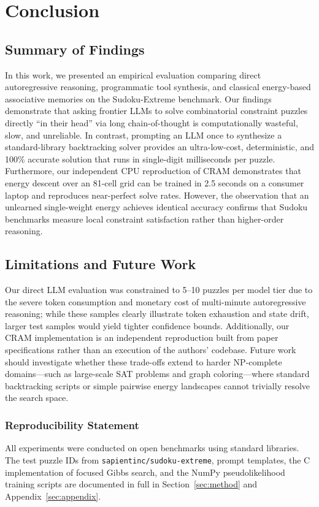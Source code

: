 \documentclass{article} %
\begin{document}
\section{Conclusion}
\label{sec:conclusion}
\subsection{Summary of Findings}
In this work, we presented an empirical evaluation comparing direct autoregressive reasoning, programmatic tool synthesis, and classical energy-based associative memories on the Sudoku-Extreme benchmark. Our findings demonstrate that asking frontier LLMs to solve combinatorial constraint puzzles directly ``in their head'' via long chain-of-thought is computationally wasteful, slow, and unreliable. In contrast, prompting an LLM once to synthesize a standard-library backtracking solver provides an ultra-low-cost, deterministic, and 100\% accurate solution that runs in single-digit milliseconds per puzzle. Furthermore, our independent CPU reproduction of CRAM demonstrates that energy descent over an 81-cell grid can be trained in 2.5 seconds on a consumer laptop and reproduces near-perfect solve rates. However, the observation that an unlearned single-weight energy achieves identical accuracy confirms that Sudoku benchmarks measure local constraint satisfaction rather than higher-order reasoning.

\subsection{Limitations and Future Work}
Our direct LLM evaluation was constrained to 5--10 puzzles per model tier due to the severe token consumption and monetary cost of multi-minute autoregressive reasoning; while these samples clearly illustrate token exhaustion and state drift, larger test samples would yield tighter confidence bounds. Additionally, our CRAM implementation is an independent reproduction built from paper specifications rather than an execution of the authors' codebase. Future work should investigate whether these trade-offs extend to harder NP-complete domains—such as large-scale SAT problems and graph coloring—where standard backtracking scripts or simple pairwise energy landscapes cannot trivially resolve the search space.

\subsubsection*{Reproducibility Statement}
All experiments were conducted on open benchmarks using standard libraries. The test puzzle IDs from \texttt{sapientinc/sudoku-extreme}, prompt templates, the C implementation of focused Gibbs search, and the NumPy pseudolikelihood training scripts are documented in full in Section~\ref{sec:method} and Appendix~\ref{sec:appendix}.
\end{document}
